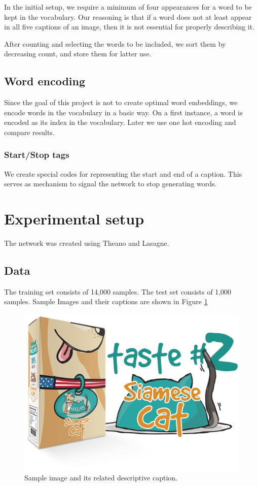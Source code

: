 \documentclass{article}
\begin{document}
In the initial setup, we require a minimum of four appearances for a word to be kept in the vocabulary. Our reasoning is that if a word does not at least appear in all five captions of an image, then it is not essential for properly describing it.

After counting and selecting the words to be included, we sort them by decreasing count, and store them for latter use.

\subsection{Word encoding}
Since the goal of this project is not to create optimal word embeddings, we encode words in the vocabulary in a basic way.
On a first instance, a word is encoded as its index in the vocabulary. Later we use one hot encoding and compare results. 

\subsubsection{Start/Stop tags} 
We create special codes for representing the start and end of a caption. This serves as mechanism to signal the network to stop generating words.

\section{Experimental setup}
The network was created using Theano and Lasagne.

\subsection{Data}
The training set consists of 14,000 samples. The test set consists of 1,000 samples. Sample Images and their captions are shown in Figure \ref{fig:sample_input}

\begin{figure}[H]
  \centering
  \includegraphics[width=.36\linewidth]{./images/sample_input.png}
  \caption{Sample image and its related descriptive caption.}
  \label{fig:sample_input}
\end{figure}
\end{document}

